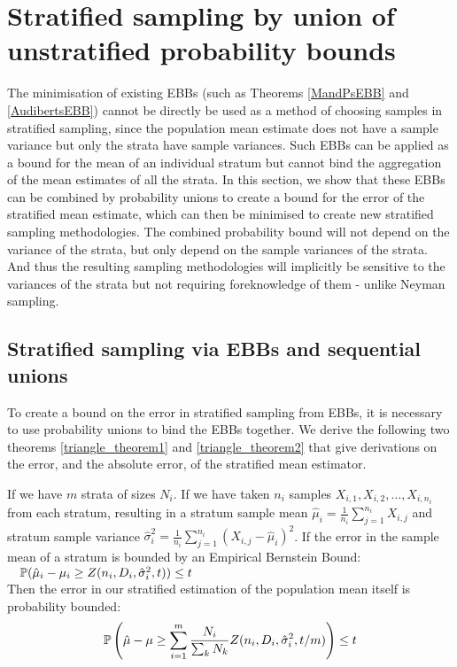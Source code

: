 
\section{Stratified sampling by union of unstratified probability bounds}\label{section:old_statistics}

The minimisation of existing EBBs (such as Theorems \ref{MandPsEBB} and \ref{AudibertsEBB}) cannot be directly be used as a method of choosing samples in stratified sampling, since the population mean estimate does not have a sample variance but only the strata have sample variances. Such EBBs can be applied as a bound for the mean of an individual stratum but cannot bind the aggregation of the mean estimates of all the strata.
In this section, we show that these EBBs can be combined by probability unions to create a bound for the error of the stratified mean estimate, which can then be minimised to create new stratified sampling methodologies.
The combined probability bound will not depend on the variance of the strata, but only depend on the sample variances of the strata.
And thus the resulting sampling methodologies will implicitly be sensitive to the variances of the strata but not requiring foreknowledge of them - unlike Neyman sampling.

\subsection{Stratified sampling via EBBs and sequential unions}\label{section:unionising_ebbs}

To create a bound on the error in stratified sampling from EBBs, it is necessary to use probability unions to bind the EBBs together.
We derive the following two theorems \ref{triangle_theorem1} and \ref{triangle_theorem2} that give derivations on the error, and the absolute error, of the stratified mean estimator.

\begin{theorem}\label{triangle_theorem1}
If we have $m$ strata of sizes $N_i$. If we have taken $n_i$ samples $X_{i,1},X_{i,2},\dots,X_{i,n_i}$ from each stratum, resulting in a stratum sample mean $\hat{\mu}_i = \frac{1}{n_i}\sum_{j=1}^{n_i}X_{i,j}$ and stratum sample variance $\hat{\sigma}_i^2=\frac{1}{n_i}\sum_{j=1}^{n_i}(X_{i,j}-\hat{\mu}_i)^2 $.
If the error in the sample mean of a stratum is bounded by an Empirical Bernstein Bound:
$\quad \operatorname{\mathbb{P}}(\hat{\mu}_i-\mu_i \ge Z(n_i,D_i,\hat{\sigma}^2_i,t)) \le t $\\
Then the error in our stratified estimation of the population mean itself is probability bounded:
$$ \operatorname{\mathbb{P}}\left(\hat{\mu}-\mu \ge \sum_{i=1}^m\frac{N_i}{\sum_kN_k} Z(n_i,D_i,\hat{\sigma}^2_i,t/m)\right)\le t $$
\end{theorem}

